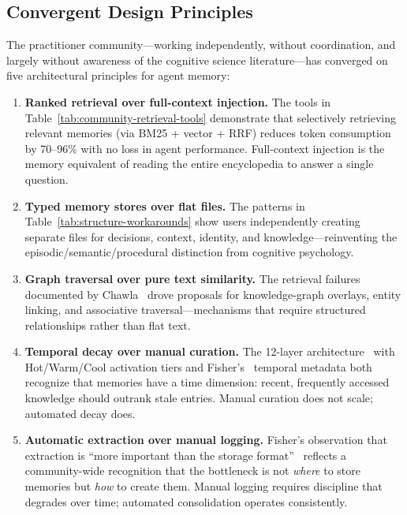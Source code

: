 \subsection{Convergent Design Principles}
\label{sec:memorymd-convergence}

The practitioner community---working independently, without
coordination, and largely without awareness of the cognitive science
literature---has converged on five architectural principles for agent
memory:

\begin{enumerate}[leftmargin=*, nosep]
    \item \textbf{Ranked retrieval over full-context injection.}  The
    tools in Table~\ref{tab:community-retrieval-tools} demonstrate that
    selectively retrieving relevant memories (via BM25 + vector + RRF)
    reduces token consumption by 70--96\% with no loss in agent
    performance.  Full-context injection is the memory equivalent of
    reading the entire encyclopedia to answer a single question.

    \item \textbf{Typed memory stores over flat files.}  The patterns
    in Table~\ref{tab:structure-workarounds} show users independently
    creating separate files for decisions, context, identity, and
    knowledge---reinventing the episodic/semantic/procedural distinction
    from cognitive psychology.

    \item \textbf{Graph traversal over pure text similarity.}  The
    retrieval failures documented by Chawla~\cite{chawla2026} drove
    proposals for knowledge-graph overlays, entity linking, and
    associative traversal---mechanisms that require structured
    relationships rather than flat text.

    \item \textbf{Temporal decay over manual curation.}  The 12-layer
    architecture~\cite{coolmanns2026} with Hot/Warm/Cool activation
    tiers and Fisher's~\cite{fisher2026} temporal metadata both
    recognize that memories have a time dimension: recent, frequently
    accessed knowledge should outrank stale entries.  Manual curation
    does not scale; automated decay does.

    \item \textbf{Automatic extraction over manual logging.}  Fisher's
    observation that extraction is ``more important than the storage
    format''~\cite{fisher2026} reflects a community-wide recognition
    that the bottleneck is not \emph{where} to store memories but
    \emph{how} to create them.  Manual logging requires discipline that
    degrades over time; automated consolidation operates consistently.
\end{enumerate}

